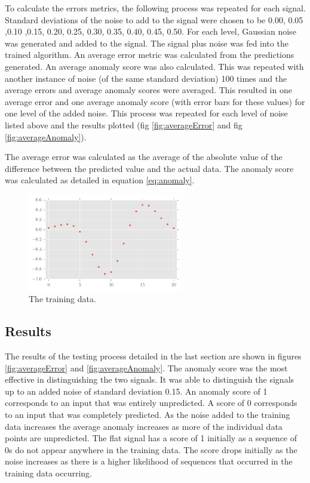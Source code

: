 \documentclass[a4paper]{jpconf}
\begin{document}
		To calculate the errors metrics, the following process was repeated for each signal. Standard deviations of the noise to add to the signal were chosen to be 0.00, 0.05 ,0.10 ,0.15, 0.20, 0.25, 0.30, 0.35, 0.40, 0.45, 0.50. For each level, Gaussian noise was generated and added to the signal. The signal plus noise was fed into the trained algorithm. An average error metric was calculated from the predictions generated. An average anomaly score was also calculated. This was repeated with another instance of noise (of the same standard deviation) 100 times and the average errors and average anomaly scores were averaged. This resulted in one average error and one average anomaly score (with error bars for these values) for one level of the added noise. This process was repeated for each level of noise listed above and the results plotted (fig \ref{fig:averageError} and fig \ref{fig:averageAnomaly}).
		
		The average error was calculated as the average of the absolute value of the difference between the predicted value and the actual data. The anomaly score was calculated as detailed in equation \ref{eq:anomaly}.
		\begin{figure}
			\centering
			\includegraphics[width=0.6\textwidth]{trimmedGlitch1Plot.pdf}
			\caption{\label{fig:trimmedGlitch1}The training data.}
		\end{figure}
		
	\subsection{Results}
		The results of the testing process detailed in the last section are shown in figures \ref{fig:averageError} and \ref{fig:averageAnomaly}. The anomaly score was the most effective in distinguishing the two signals. It was able to distinguish the signals up to an added noise of standard deviation 0.15. 
		An anomaly score of 1 corresponds to an input that was entirely unpredicted. A score of 0 corresponds to an input that was completely predicted. As the noise added to the training data increases the average anomaly increases as more of the individual data points are unpredicted. The flat signal has a score of 1 initially as a sequence of 0s do not appear anywhere in the training data. The score drops initially as the noise increases as there is a higher likelihood of sequences that occurred in the training data occurring.
		
\end{document}
